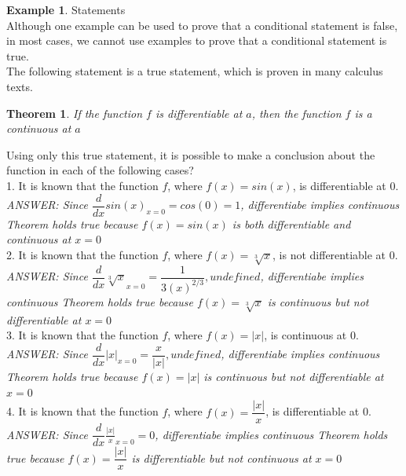 \documentclass{book}
\newtheorem{theorem}{Theorem}[section]
\theoremstyle{definition}
\newtheorem{example}{Example}[definition]
\theoremstyle{remark}
\begin{document}
\begin{example}
Statements \cite[Chap.1, P.C.1.5]{ted} \\

Although one example can be used to prove that a conditional statement is false, in most cases, we cannot use examples to prove that a conditional statement is true.  \\

The following statement is a true statement, which is proven in many calculus texts. \\

\begin{tcolorbox}
    \begin{theorem}
        If the function $f$ is differentiable at $a$, then the function $f$ is a continuous at $a$
    \end{theorem}
\end{tcolorbox}

Using only this true statement, it is possible to make a conclusion about the function in each of the following cases? \\


1. It is known that the function $f$, where $f(x)= sin(x)$, is differentiable at 0. \\
{\it ANSWER: Since $\dfrac{d}{dx}sin(x)_{x=0}=cos(0)=1$, differentiabe implies continuous Theorem holds true because $f(x)= sin(x)$ is both differentiable and continuous at $x=0$ } \\

2. It is known that the function $f$, where $f(x)= \sqrt[3]{x}$, is not differentiable at 0. \\
{\it ANSWER: Since $\dfrac{d}{dx}\sqrt[3]{x}_{x=0}= \dfrac{1}{3(x)^{2/3}}, undefined$, differentiabe implies continuous Theorem holds true because $f(x)= \sqrt[3]{x}$ is continuous but not differentiable at $x=0$ } \\

3. It is known that the function $f$, where $f(x)= |x|$, is continuous at 0. \\
{\it ANSWER: Since $\dfrac{d}{dx}|x|_{x=0} = \dfrac{x}{|x|}, undefined$, differentiabe implies continuous Theorem holds true because $f(x)= |x|$ is continuous but not differentiable at $x=0$ } \\


4. It is known that the function $f$, where $f(x)= \dfrac{|x|}{x}$, is differentiable at 0. \\
{\it ANSWER: Since $\dfrac{d}{dx}\frac{|x|}{x}_{x=0} = 0$, differentiabe implies continuous Theorem holds true because $f(x)= \dfrac{|x|}{x}$ is differentiable but not continuous at $x=0$ } \\
\end{example}
\end{document}
